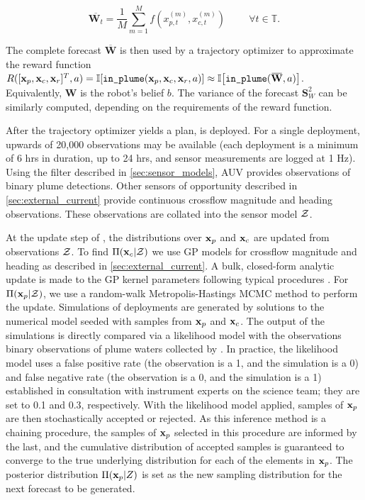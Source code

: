 \begin{equation}
    \overbar{\mathbf{W}_t} = \frac{1}{M}\sum_{m=1}^{M} f(x_{p,t}^{(m)}, x_{c,t}^{(m)}) \hspace{1cm} \forall t \in \mathbb{T}.
\end{equation}

The complete forecast $\overbar{\mathbf{W}}$ is then used by a trajectory optimizer to approximate the reward function $R([\x_p, \x_c, \x_r]^T, a) = \indic{\texttt{in\_plume}(\x_p, \x_c, \x_r, a)} \approx \indic{\texttt{in\_plume}(\overbar{\mathbf{W}}, a)}$. Equivalently, $\mathbf{W}$ is the robot's belief $b$. The variance of the forecast $\mathbf{S}^2_W$ can be similarly computed, depending on the requirements of the reward function. 

After the trajectory optimizer yields a plan, \Sentry is deployed. For a single deployment, upwards of 20,000 observations may be available (each deployment is a minimum of 6 hrs in duration, up to 24 hrs, and sensor measurements are logged at 1 Hz). Using the filter described in \cref{sec:sensor_models}, AUV \Sentry provides observations of binary plume detections. Other sensors of opportunity described in \cref{sec:external_current} provide continuous crossflow magnitude and heading observations. These observations are collated into the sensor model $\mathcal{Z}$.

At the update step of \PHUMES, the distributions over $\mathbf{x}_p$ and $\mathbf{x}_c$ are updated from observations $\mathcal{Z}$. To find $\Pi(\mathbf{x}_c|\mathcal{Z})$ we use GP models for crossflow magnitude and heading as described in \cref{sec:external_current}. A bulk, closed-form analytic update is made to the GP kernel parameters following typical procedures \cite{Rasmussen2004}. For $\Pi(\mathbf{x}_p | \mathcal{Z})$, we use a random-walk Metropolis-Hastings MCMC method \cite{metropolis1953equation} to perform the update. Simulations of deployments are generated by solutions to the numerical model seeded with samples from $\mathbf{x}_p$ and $\mathbf{x}_c$. The output of the simulations is directly compared via a likelihood model with the observations binary observations of plume waters collected by \Sentry. In practice, the likelihood model uses a false positive rate (the observation is a 1, and the simulation is a 0) and false negative rate (the observation is a 0, and the simulation is a 1) established in consultation with instrument experts on the science team; they are set to 0.1 and 0.3, respectively. With the likelihood model applied, samples of $\mathbf{x}_p$ are then stochastically accepted or rejected. As this inference method is a chaining procedure, the samples of $\mathbf{x}_p$ selected in this procedure are informed by the last, and the cumulative distribution of accepted samples is guaranteed to converge to the true underlying distribution for each of the elements in $\mathbf{x}_p$. The posterior distribution $\Pi(\mathbf{x}_p | Z)$ is set as the new sampling distribution for the next forecast to be generated.

